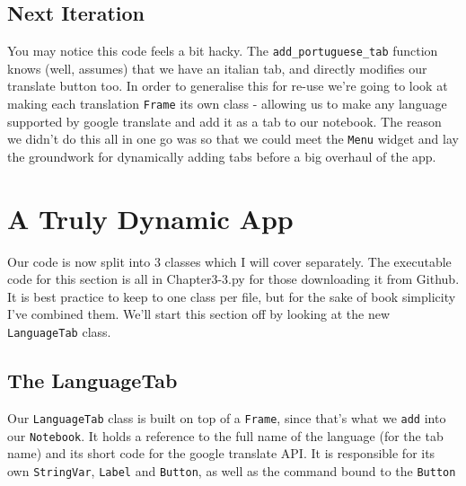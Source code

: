 \documentclass[a4paper,11pt,openany]{book}
\begin{document}
\subsection{Next Iteration}

You may notice this code feels a bit hacky. The \lstinline[columns=fixed]{add_portuguese_tab} function knows (well, assumes) that we have an italian tab, and directly modifies our translate button too. In order to generalise this for re-use we're going to look at making each translation \lstinline[columns=fixed]{Frame} its own class - allowing us to make any language supported by google translate and add it as a tab to our notebook. The reason we didn't do this all in one go was so that we could meet the \lstinline[columns=fixed]{Menu} widget and lay the groundwork for dynamically adding tabs before a big overhaul of the app.

\newpage

\section{A Truly Dynamic App}

Our code is now split into 3 classes which I will cover separately. The executable code for this section is all in Chapter3-3.py for those downloading it from Github. It is best practice to keep to one class per file, but for the sake of book simplicity I've combined them. We'll start this section off by looking at the new \lstinline[columns=fixed]{LanguageTab} class. 

\subsection{The LanguageTab}



Our \lstinline[columns=fixed]{LanguageTab} class is built on top of a \lstinline[columns=fixed]{Frame}, since that's what we \lstinline[columns=fixed]{add} into our \lstinline[columns=fixed]{Notebook}. It holds a reference to the full name of the language (for the tab name) and its short code for the google translate API. It is responsible for its own \lstinline[columns=fixed]{StringVar}, \lstinline[columns=fixed]{Label} and \lstinline[columns=fixed]{Button}, as well as the command bound to the \lstinline[columns=fixed]{Button}

\vspace{5mm}
\end{document}
